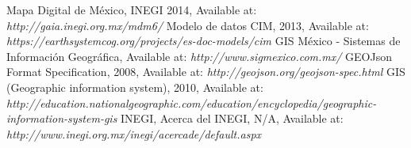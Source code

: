 \begin{thebibliography}{1}
		Mapa Digital de México, INEGI 2014, Available at: \emph{http://gaia.inegi.org.mx/mdm6/}
	   Modelo de datos CIM, 2013, Available at: \emph{https://earthsystemcog.org/projects/es-doc-models/cim}
		 GIS México - Sistemas de Información Geográfica, Available at: \emph{http://www.sigmexico.com.mx/}
	     GEOJson Format Specification, 2008, Available at: \emph{http://geojson.org/geojson-spec.html}
		 GIS (Geographic information system), 2010, Available at: \emph{http://education.nationalgeographic.com/education/encyclopedia/geographic-information-system-gis}
		INEGI, Acerca del INEGI, N/A, Available at: \emph{http://www.inegi.org.mx/inegi/acercade/default.aspx}
\end{thebibliography}